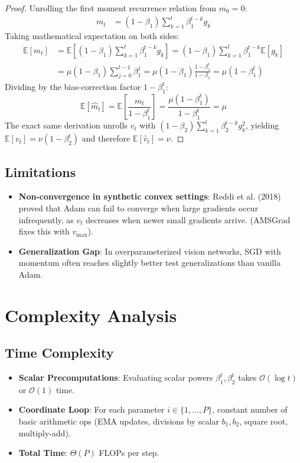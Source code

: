 \documentclass[11pt,a4paper]{article}
\theoremstyle{definition}
\begin{document}
\begin{proof}
Unrolling the first moment recurrence relation from $m_0 = 0$:
\begin{align}
m_t &= (1 - \beta_1) \sum_{k=1}^t \beta_1^{t-k} g_k
\end{align}
Taking mathematical expectation on both sides:
\begin{align}
\mathbb{E}[m_t] &= \mathbb{E}\left[(1 - \beta_1) \sum_{k=1}^t \beta_1^{t-k} g_k\right] = (1 - \beta_1) \sum_{k=1}^t \beta_1^{t-k} \mathbb{E}[g_k] \\
&= \mu (1 - \beta_1) \sum_{j=0}^{t-1} \beta_1^j = \mu (1 - \beta_1) \frac{1 - \beta_1^t}{1 - \beta_1} = \mu (1 - \beta_1^t)
\end{align}
Dividing by the bias-correction factor $1 - \beta_1^t$:
\begin{equation}
\mathbb{E}[\hat{m}_t] = \mathbb{E}\left[\frac{m_t}{1 - \beta_1^t}\right] = \frac{\mu(1 - \beta_1^t)}{1 - \beta_1^t} = \mu
\end{equation}
The exact same derivation unrolls $v_t$ with $(1 - \beta_2) \sum_{k=1}^t \beta_2^{t-k} g_k^2$, yielding $\mathbb{E}[v_t] = \nu(1 - \beta_2^t)$ and therefore $\mathbb{E}[\hat{v}_t] = \nu$.
\end{proof}

\subsection{Limitations}
\begin{itemize}
    \item \textbf{Non-convergence in synthetic convex settings}: Reddi et al. (2018) proved that Adam can fail to converge when large gradients occur infrequently, as $v_t$ decreases when newer small gradients arrive. (AMSGrad fixes this with $v_{\max}$).
    \item \textbf{Generalization Gap}: In overparameterized vision networks, SGD with momentum often reaches slightly better test generalizations than vanilla Adam.
\end{itemize}

\section{Complexity Analysis}

\subsection{Time Complexity}
\begin{itemize}
    \item \textbf{Scalar Precomputations}: Evaluating scalar powers $\beta_1^t, \beta_2^t$ takes $\mathcal{O}(\log t)$ or $\mathcal{O}(1)$ time.
    \item \textbf{Coordinate Loop}: For each parameter $i \in \{1, \dots, P\}$, constant number of basic arithmetic ops (EMA updates, divisions by scalar $b_1, b_2$, square root, multiply-add).
    \item \textbf{Total Time}: $\Theta(P)$ FLOPs per step.
\end{itemize}
\end{document}
